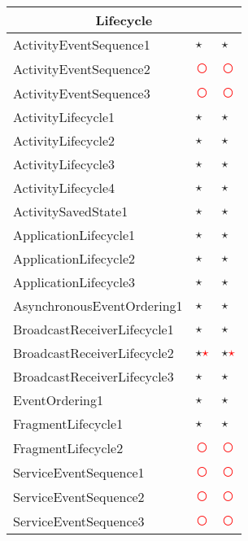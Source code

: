 \documentclass[../draft.tex]{subfiles}
\newcommand{\fp}{\textcolor{white}{\textcircled{\textcolor{red}{$\star$}}}}
\newcommand{\fn}{\textcolor{red}{\textcircled{ }}}
\newcommand{\tp}[0]{\textcircled{$\star$}}
\newcommand{\tsub}[1]{\multicolumn{3}{c}{#1}\\\hline}
\begin{document}
\begin{longtable}{l | l | l}
        \tsub{Lifecycle}
        ActivityEventSequence1 & \tp & \tp\\
        ActivityEventSequence2 & \fn & \fn\\
        ActivityEventSequence3 & \fn & \fn\\
        ActivityLifecycle1 & \tp & \tp\\
        ActivityLifecycle2 & \tp & \tp\\
        ActivityLifecycle3 & \tp & \tp\\
        ActivityLifecycle4 & \tp & \tp\\
        ActivitySavedState1 & \tp & \tp\\
        ApplicationLifecycle1 & \tp & \tp\\
        ApplicationLifecycle2 & \tp & \tp\\
        ApplicationLifecycle3 & \tp & \tp\\
        AsynchronousEventOrdering1 & \tp & \tp\\
        BroadcastReceiverLifecycle1 & \tp & \tp\\
        BroadcastReceiverLifecycle2 & \tp \fp & \tp \fp\\
        BroadcastReceiverLifecycle3 & \tp & \tp\\
        EventOrdering1 & \tp & \tp\\
        FragmentLifecycle1 & \tp & \tp\\
        FragmentLifecycle2 & \fn & \fn\\
        ServiceEventSequence1 & \fn & \fn\\
        ServiceEventSequence2 & \fn & \fn\\
        ServiceEventSequence3 & \fn & \fn\\

\end{longtable}
\end{document}
